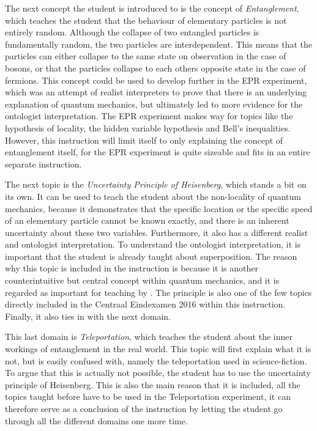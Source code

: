 \documentclass[11pt,twoside]{report} %
\begin{document}
The next concept the student is introduced to is the concept of \emph{Entanglement}, which teaches the student that the behaviour of elementary particles is not entirely random. Although the collapse of two entangled particles is fundamentally random, the two particles are interdependent. This means that the particles can either collapse to the same state on observation in the case of bosons, or that the particles collapse to each others opposite state in the case of fermions. This concept could be used to develop further in the EPR experiment, which was an attempt of realist interpreters to prove that there is an underlying explanation of quantum mechanics, but ultimately led to more evidence for the ontologist interpretation. The EPR experiment makes way for topics like the hypothesis of locality, the hidden variable hypothesis and Bell's inequalities. However, this instruction will limit itself to only explaining the concept of entanglement itself, for the EPR experiment is quite sizeable and fits in an entire separate instruction.

The next topic is the \emph{Uncertainty Principle of Heisenberg}, which stands a bit on its own. It can be used to teach the student about the non-locality of quantum mechanics, because it demonstrates that the specific location or the specific speed of an elementary particle cannot be known exactly, and there is an inherent uncertainty about these two variables. Furthermore, it also has a different realist and ontologist interpretation. To understand the ontologist interpretation, it is important that the student is already taught about superposition. The reason why this topic is included in the instruction is because it is another counterintuitive but central concept within quantum mechanics, and it is regarded as important for teaching by . The principle is also one of the few topics directly included in the Centraal Eindexamen 2016 \cite{eindexamen2016} within this instruction. Finally, it also ties in with the next domain.

This last domain is \emph{Teleportation}, which teaches the student about the inner workings of entanglement in the real world. This topic will first explain what it is not, but is easily confused with, namely the teleportation used in science-fiction. To argue that this is actually not possible, the student has to use the uncertainty principle of Heisenberg. This is also the main reason that it is included, all the topics taught before have to be used in the Teleportation experiment, it can therefore  serve as a conclusion of the instruction by letting the student go through all the different domains one more time.
\end{document}
